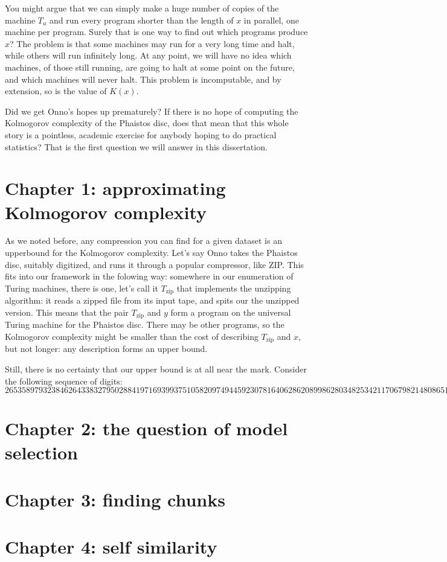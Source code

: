You might argue that we can simply make a huge number of copies of the machine $T_u$ and run every program shorter than the length of $x$ in parallel, one machine per program. Surely that is one way to find out which programs produce $x$? The problem is that some machines may run for a very long time and halt, while others will run infinitely long. At any point, we will have no idea which machines, of those still running, are going to halt at some point on the future, and which machines will never halt. This problem is incomputable, and by extension, so is the value of $K(x)$.

Did we get Onno's hopes up prematurely? If there is no hope of computing the Kolmogorov complexity of the Phaistos disc, does that mean that this whole story is a pointless, academic exercise for anybody hoping to do practical statistics? That is the first question we will answer in this dissertation.

\section{Chapter 1: approximating Kolmogorov complexity} 

As we noted before, any compression you can find for a given dataset is an upperbound for the Kolmogorov complexity. Let's say Onno takes the Phaistos disc, suitably digitized, and runs it through a popular compressor, like ZIP. This fits into our framework in the folowing way: somewhere in our enumeration of Turing machines, there is one, let's call it $T_\text{zip}$ that implements the unzipping algorithm: it reads a zipped file from its input tape, and spits our the unzipped version. This means that the pair $T_\text{zip}$ and $y$ form a program on the universal Turing machine for the Phaistos disc. There may be other programs, so the Kolmogorov complexity might be smaller than the cost of describing $T_\text{zip}$ and $x$, but not longer: any description forms an upper bound.

Still, there is no certainty that our upper bound is at all near the mark. Consider the following sequence of digits:
\[
265358979323846264338327950288419716939937510582097494459230781640628620899862803482534211706798214808651328
\]


\section{Chapter 2: the question of model selection}

\section{Chapter 3: finding chunks}

\section{Chapter 4: self similarity}




